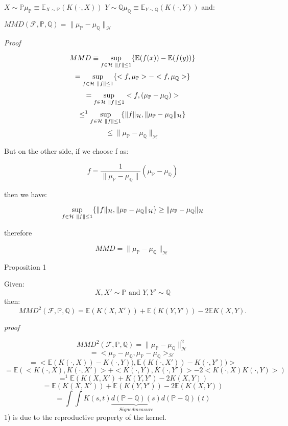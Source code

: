 \documentclass[8pt,a4paper]{article}
\providecommand{\norm}[1]{\lVert#1\rVert}
\begin{document}
$X \sim \mathbb{P} \mu_{\mathbb{P}} \equiv \mathbb{E}_{X\sim \mathbb{P}}(K(\cdot,X))$ $Y \sim \mathbb{Q} \mu_{\mathbb{Q}} \equiv \mathbb{E}_{Y\sim \mathbb{Q}}(K(\cdot,Y))$ 
and:

$MMD(\mathcal{F},\mathbb{P}, \mathbb{Q}) = \norm{\mu_{\mathbb{P}} - \mu_{\mathbb{Q}}}_{\mathcal{H}}$

\textit{Proof}

$$MMD \equiv \sup\limits_{f\in \mathcal{H} \\\ \norm{f} \leq 1}\{\mathbb{E}(f(x)) - \mathbb{E}(f(y))\}$$
$$=\sup\limits_{f\in \mathcal{H} \\\ \norm{f} \leq 1}\{<f,\mu_\mathbb{P}> - <f, \mu_\mathbb{Q}> \} $$
$$=\sup\limits_{f\in \mathcal{H} \\\ \norm{f} \leq 1} <f,(\mu_{\mathbb{P}} - \mu_{\mathbb{Q}})> $$
$$\leq^{1} \sup\limits_{f\in \mathcal{H} \\\ \norm{f} \leq 1}\{\norm{f}_{\mathcal{H}},\norm{\mu_\mathbb{P} - \mu_{\mathbb{Q}}}_{\mathcal{H}}\}$$
$$\leq \norm{\mu_{\mathbb{P}} - \mu_{\mathbb{Q}}}_{\mathcal{H}}$$

But on the other side, if we choose f as:

$$f=\frac{1}{\norm{\mu_{\mathbb{P}}- \mu_{\mathbb{Q}}}} (\mu_{\mathbb{P}}- \mu_{\mathbb{Q}})$$

then we have:

$$\sup\limits_{f\in \mathcal{H} \\\ \norm{f} \leq 1}\{\norm{f}_{\mathcal{H}},\norm{\mu_\mathbb{P} - \mu_{\mathbb{Q}}}_{\mathcal{H}}\} \geq \norm{\mu_{\mathbb{P}}- \mu_{\mathbb{Q}}}_{\mathcal{H}} $$

therefore

$$MMD = \norm{\mu_{\mathbb{P}}- \mu_{\mathbb{Q}}}_{\mathcal{H}}$$

\textsf{Proposition 1}

Given:
$$X,X' \sim \mathbb{P} \text{ and } Y,Y' \sim \mathbb{Q}$$
then:
$$MMD^{2}(\mathcal{F},\mathbb{P},\mathbb{Q}) = \mathbb{E}(K(X,X')) + \mathbb{E}(K(Y,Y')) - 2\mathbb{E}K(X,Y).$$

\textit{proof}
\begin{center}


$$MMD^{2}(\mathcal{F},\mathbb{P},\mathbb{Q}) = \norm{\mu_{\mathbb{P}}- \mu_{\mathbb{Q}}}_{\mathcal{H}}^{2}$$
$$=<\mu_{\mathbb{P}}- \mu_{\mathbb{Q}},\mu_{\mathbb{P}}- \mu_{\mathbb{Q}}>_{\mathcal{H}}$$
$$=<\mathbb{E}(K(\cdot,X))-K(\cdot,Y)),\mathbb{E}(K(\cdot,X'))-K(\cdot,Y'))>$$
$$=\mathbb{E}(<K(\cdot,X),K(\cdot,X')> + <K(\cdot,Y),K(\cdot,Y')> - 2<K(\cdot,X)K(\cdot,Y)>)$$
$$=^{1} \mathbb{E}(K(X,X') + K(Y,Y') -2K(X,Y))
$$
$$= \mathbb{E}(K(X,X')) + \mathbb{E}(K(Y,Y')) -2\mathbb{E}(K(X,Y))
$$
$$= \int\int K(s,t) \underbrace{d(\mathbb{P}-\mathbb{Q})(s)}_{Signed measure} d(\mathbb{P}-\mathbb{Q})(t)
$$
1) is due to the reproductive property of the kernel.
\end{center}
\end{document}
